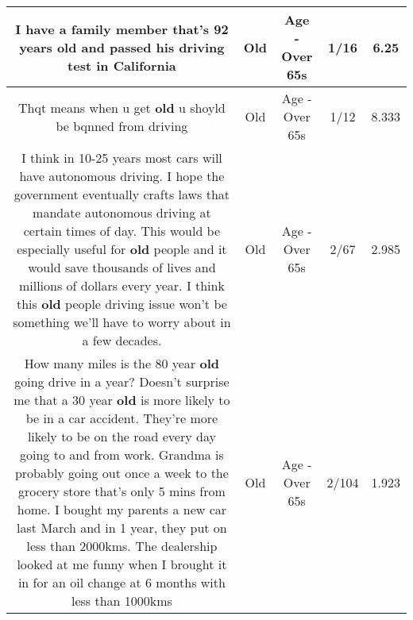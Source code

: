 \documentclass[11pt]{article}
\newlength\mylength
\begin{document}
\begin{center}
\begin{longtable}{|C{.65\mylength}|C{.30\mylength}|C{.12\mylength}|C{.12\mylength}|C{.12\mylength}|}
  \small I have a family member that's 92 years \textbf{old} and passed his driving test in California\normalsize   & Old & Age - Over 65s & 1/16 & 6.25 \\  \hline
  \small Thqt means when u get \textbf{old} u shoyld be bqnned from driving\normalsize   & Old & Age - Over 65s & 1/12 & 8.333 \\  \hline
  \small I think in 10-25 years most cars will have autonomous driving. I hope the government eventually crafts laws that mandate autonomous driving at certain times of day. This would be especially useful for \textbf{old} people and it would save thousands of lives and millions of dollars every year. I think this \textbf{old} people driving issue won't be something we'll have to worry about in a few decades.\normalsize   & Old & Age - Over 65s & 2/67 & 2.985 \\  \hline
  \small How many miles is the 80 year \textbf{old} going drive in a year?  Doesn't surprise me that a 30 year \textbf{old} is more likely to be in a car accident.  They're more likely to be on the road every day going to and from work.  Grandma is probably going out once a week to the grocery store that's only 5 mins from home.  I bought my parents a new car last March and in 1 year, they put on less than 2000kms.  The dealership looked at me funny when I brought it in for an oil change at 6 months with less than 1000kms\normalsize   & Old & Age - Over 65s & 2/104 & 1.923 \\  \hline

\end{longtable}
\end{center}
\end{document}
